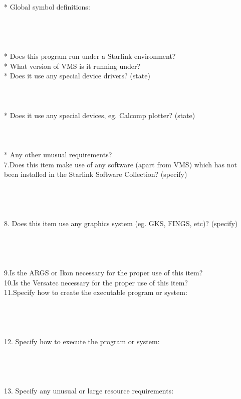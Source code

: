 \begin{tabbing}
\>* Global symbol definitions:\\
\\
\\
\\
\\
\>* Does this program run under a Starlink environment?\\
\>* What version of VMS is it running under?\\
\>* Does it use any special device drivers? (state)\\
\\
\\
\\
\>* Does it use any special devices, eg. Calcomp plotter? (state)\\
\\
\\
\\
\>* Any other unusual requirements?\\
7.\>Does this item make use of any software (apart from VMS) which has not\\
\>been installed in the Starlink Software Collection? (specify)\\
\\
\\
\\
\\
8.\> Does this item use any graphics system (eg. GKS, FINGS, etc)? (specify)\\
\\
\\
\\
\\
9.\>Is the ARGS or Ikon necessary for the proper use of this item?\\
10.\>Is the Versatec necessary for the proper use of this item?\\
11.\>Specify how to create the executable program or system:\\
\\
\\
\\
\\
12. Specify how to execute the program or system:\\
\\
\\
\\
\\
13. Specify any unusual or large resource requirements:\\
\\
\\
\\

\end{tabbing}
